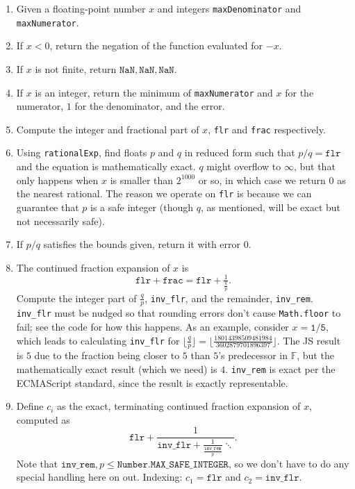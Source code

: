 \documentclass{article}
\newcommand{\NaN}{\texttt{NaN}}
\newcommand{\finitefp}{\mathbb{F}}
\begin{document}
\begin{enumerate}[label=(\alph*)]
  \item Given a floating-point number $x$ and integers \texttt{maxDenominator} and \texttt{maxNumerator}.
  \item If $x < 0$, return the negation of the function evaluated for $-x$.
  \item If $x$ is not finite, return $\NaN, \NaN, \NaN$.
  \item If $x$ is an integer, return the minimum of \texttt{maxNumerator} and $x$ for the numerator, $1$ for the denominator, and the error.
  \item Compute the integer and fractional part of $x$, \texttt{flr} and \texttt{frac} respectively.
  \item Using \texttt{rationalExp}, find floats $p$ and $q$ in reduced form such that $p/q=\texttt{flr}$ and the equation is mathematically exact. $q$ might overflow to $\infty$, but that only happens when $x$ is smaller than $2^{1000}$ or so, in which case we return $0$ as the nearest rational. The reason we operate on \texttt{flr} is because we can guarantee that $p$ is a safe integer (though $q$, as mentioned, will be exact but not necessarily safe).
  \item If $p/q$ satisfies the bounds given, return it with error $0$.
  \item The continued fraction expansion of $x$ is $$\texttt{flr} + \texttt{frac}=\texttt{flr} + \tfrac{1}{\tfrac{q}{p}}.$$ Compute the integer part of $\frac{q}{p}$, \texttt{inv\_flr}, and the remainder, \texttt{inv\_rem}. \texttt{inv\_flr} must be nudged so that rounding errors don't cause \texttt{Math.floor} to fail; see the code for how this happens. As an example, consider $x=\texttt{1/5}$, which leads to calculating \texttt{inv\_flr} for $\lfloor\frac{q}{p}\rfloor=\lfloor\frac{18014398509481984}{3602879701896397}\rfloor$. The JS result is $5$ due to the fraction being closer to $5$ than $5$'s predecessor in $\finitefp$, but the mathematically exact result (which we need) is $4$. \texttt{inv\_rem} is exact per the ECMAScript standard, since the result is exactly representable.
  \item Define $c_i$ as the exact, terminating continued fraction expansion of $x$, computed as $$\texttt{flr} + \frac{1}{\texttt{inv\_flr} + \frac{1}{\frac{\texttt{inv\_rem}}{p}}\ddots}.$$ Note that $\texttt{inv\_rem},p \leq \texttt{Number.MAX\_SAFE\_INTEGER}$, so we don't have to do any special handling here on out. Indexing: $c_1 = \texttt{flr}$ and $c_2 = \texttt{inv\_flr}$.

\end{enumerate}
\end{document}
